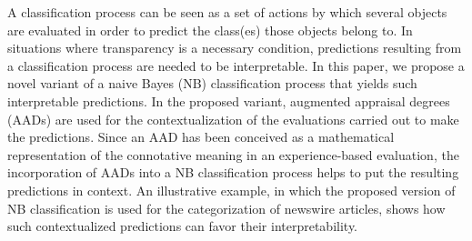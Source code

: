 
A classification process can be seen as a set of actions by which several objects are evaluated in order to predict the class(es) those objects belong to. %
%
In situations where transparency is a necessary condition, predictions resulting from a classification process are needed to be interpretable. %
%
In this paper, we propose a novel variant of a naive Bayes (NB) classification process that yields such interpretable predictions. %
%
In the proposed variant, augmented appraisal degrees (AADs) are used for the contextualization of the evaluations carried out to make the predictions. %
%
Since an AAD has been conceived as a mathematical representation of the connotative meaning in an experience-based evaluation, the incorporation of AADs into a NB classification process helps to put the resulting predictions in context. %
%
An illustrative example, in which the proposed version of NB classification is used for the categorization of newswire articles, shows how such contextualized predictions can favor their interpretability. %
%


